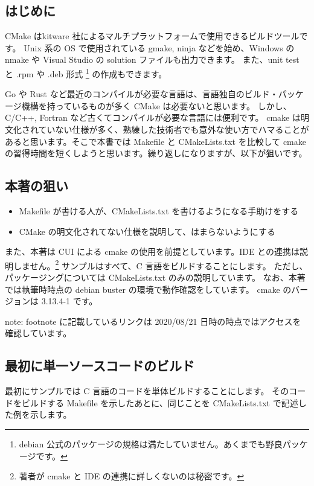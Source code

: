 \documentclass[mingoth,a4paper]{jsarticle}
\begin{document}
\subsection{はじめに}

CMake はkitware 社によるマルチプラットフォームで使用できるビルドツールです。
Unix 系の OS で使用されている gmake, ninja などを始め、Windows の nmake や Visual Studio の solution ファイルも出力できます。
また、unit test と .rpm や .deb 形式 \footnote{debian 公式のパッケージの規格は満たしていません。あくまでも野良パッケージです。} の作成もできます。

Go や Rust など最近のコンパイルが必要な言語は、言語独自のビルド・パッケージ機構を持っているものが多く CMake は必要ないと思います。
しかし、C/C++, Fortran など古くてコンパイルが必要な言語には便利です。
cmake は明文化されていない仕様が多く、熟練した技術者でも意外な使い方でハマることがあると思います。そこで本書では Makefile と CMakeLists.txt  を比較して cmake の習得時間を短くしようと思います。繰り返しになりますが、以下が狙いです。

\subsection{本著の狙い}
\begin{itemize}
  \item{Makefile が書ける人が、CMakeLists.txt を書けるようになる手助けをする}
  \item{CMake の明文化されてない仕様を説明して、はまらないようにする}
\end{itemize}

また、本著は CUI による cmake の使用を前提としています。IDE との連携は説明しません。\footnote{著者が cmake と IDE の連携に詳しくないのは秘密です。}
サンプルはすべて、C 言語をビルドすることにします。
ただし、パッケージングについては CMakeLists.txt のみの説明しています。
なお、本著では執筆時時点の debian buster の環境で動作確認をしています。
cmake のバージョンは 3.13.4-1 です。

note: footnote に記載しているリンクは 2020/08/21  日時の時点ではアクセスを確認しています。
\clearpage

\subsection{最初に単一ソースコードのビルド}
最初にサンプルでは C 言語のコードを単体ビルドすることにします。
そのコードをビルドする Makefile を示したあとに、同じことを CMakeLists.txt で記述した例を示します。
\end{document}
